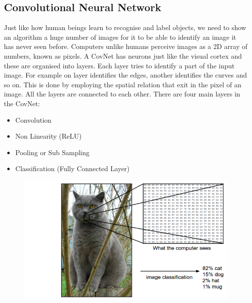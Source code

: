 \documentclass[12pt, a4paper,oneside]{report}
\begin{document}
\subsection{Convolutional Neural Network}
Just like how human beings learn to recognise and label objects, we need to show an algorithm a huge number of images for it to be able to identify an image it has never seen before. Computers unlike humans perceive images as a 2D array of numbers, known as pixels. A CovNet has neurons just like the visual cortex and these are organised into layers. Each layer tries to identify a part of the input image. For example on layer identifies the edges, another identifies the curves and so on. This is done by employing the spatial relation that exit in the pixel of an image. All the layers are connected to each other. There are four main layers in the CovNet:

\begin{itemize}
	\item Convolution
	\item Non Linearity (ReLU)
	\item Pooling or Sub Sampling
	\item Classification (Fully Connected Layer)
\end{itemize} 


\begin{figure}[htb!]
	\includegraphics [scale=0.5] {cat}
	\label{fig:cat}
\end{figure}
\end{document}
